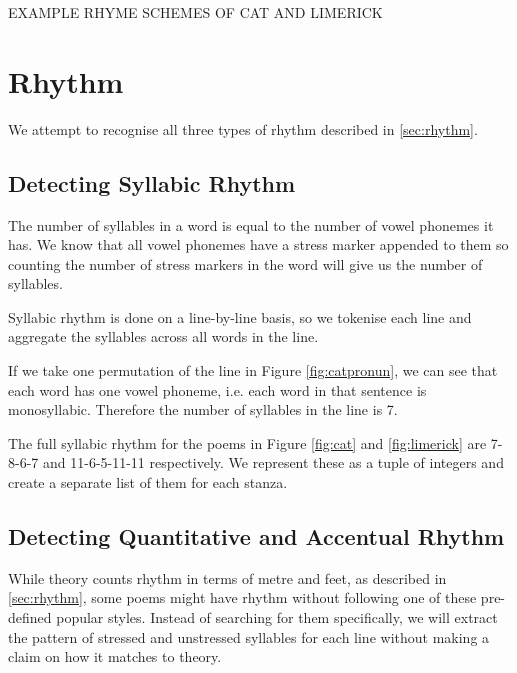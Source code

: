 EXAMPLE RHYME SCHEMES OF CAT AND LIMERICK

\section{Rhythm}

We attempt to recognise all three types of rhythm described in \ref{sec:rhythm}. 

\subsection{Detecting Syllabic Rhythm}

The number of syllables in a word is equal to the number of vowel phonemes it has. We know that all vowel phonemes have a stress marker appended to them so counting the number of stress markers in the word will give us the number of syllables.

Syllabic rhythm is done on a line-by-line basis, so we tokenise each line and aggregate the syllables across all words in the line.

If we take one permutation of the line in Figure \ref{fig:catpronun}, we can see that each word has one vowel phoneme, i.e. each word in that sentence is monosyllabic. Therefore the number of syllables in the line is 7.

The full syllabic rhythm for the poems in Figure \ref{fig:cat} and \ref{fig:limerick} are 7-8-6-7 and 11-6-5-11-11 respectively. We represent these as a tuple of integers and create a separate list of them for each stanza.

\subsection{Detecting Quantitative and Accentual Rhythm}

While theory counts rhythm in terms of metre and feet, as described in \ref{sec:rhythm}, some poems might have rhythm without following one of these pre-defined popular styles. Instead of searching for them specifically, we will extract the pattern of stressed and unstressed syllables for each line without making a claim on how it matches to theory.

